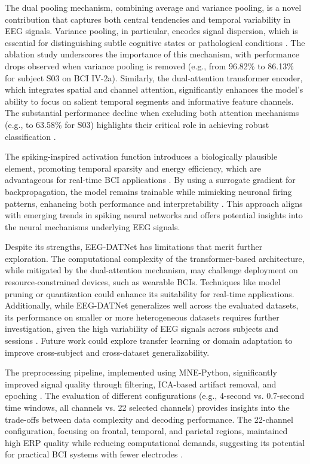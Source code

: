 \documentclass[pdflatex,sn-mathphys-num]{sn-jnl}%
\theoremstyle{thmstyleone}%
\theoremstyle{thmstyletwo}%
\theoremstyle{thmstylethree}%
\begin{document}
The dual pooling mechanism, combining average and variance pooling, is a novel contribution that captures both central tendencies and temporal variability in EEG signals. Variance pooling, in particular, encodes signal dispersion, which is essential for distinguishing subtle cognitive states or pathological conditions \cite{roy2019chronnectome}. The ablation study underscores the importance of this mechanism, with performance drops observed when variance pooling is removed (e.g., from 96.82\% to 86.13\% for subject S03 on BCI IV-2a). Similarly, the dual-attention transformer encoder, which integrates spatial and channel attention, significantly enhances the model’s ability to focus on salient temporal segments and informative feature channels. The substantial performance decline when excluding both attention mechanisms (e.g., to 63.58\% for S03) highlights their critical role in achieving robust classification \cite{vaswani2017attention}.

The spiking-inspired activation function introduces a biologically plausible element, promoting temporal sparsity and energy efficiency, which are advantageous for real-time BCI applications \cite{maass2002real}. By using a surrogate gradient for backpropagation, the model remains trainable while mimicking neuronal firing patterns, enhancing both performance and interpretability \cite{neftci2019surrogate}. This approach aligns with emerging trends in spiking neural networks and offers potential insights into the neural mechanisms underlying EEG signals.

Despite its strengths, EEG-DATNet has limitations that merit further exploration. The computational complexity of the transformer-based architecture, while mitigated by the dual-attention mechanism, may challenge deployment on resource-constrained devices, such as wearable BCIs. Techniques like model pruning or quantization could enhance its suitability for real-time applications. Additionally, while EEG-DATNet generalizes well across the evaluated datasets, its performance on smaller or more heterogeneous datasets requires further investigation, given the high variability of EEG signals across subjects and sessions \cite{lotte2018review}. Future work could explore transfer learning or domain adaptation to improve cross-subject and cross-dataset generalizability.

The preprocessing pipeline, implemented using MNE-Python, significantly improved signal quality through filtering, ICA-based artifact removal, and epoching \cite{Gramfort2013}. The evaluation of different configurations (e.g., 4-second vs. 0.7-second time windows, all channels vs. 22 selected channels) provides insights into the trade-offs between data complexity and decoding performance. The 22-channel configuration, focusing on frontal, temporal, and parietal regions, maintained high ERP quality while reducing computational demands, suggesting its potential for practical BCI systems with fewer electrodes \cite{PerroneBertolotti2014}.
\end{document}
